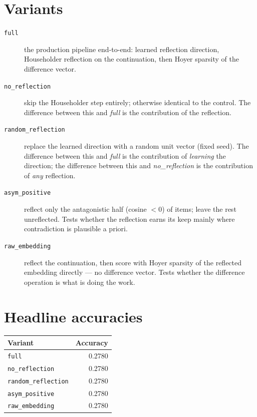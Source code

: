 \documentclass[11pt]{article}
\begin{document}
\section{Variants}
\begin{description}
\item[\texttt{full}] the production pipeline end-to-end: learned reflection direction, Householder reflection on the continuation, then Hoyer sparsity of the difference vector.
\item[\texttt{no\_reflection}] skip the Householder step entirely; otherwise identical to the control. The difference between this and \textit{full} is the contribution of the reflection.
\item[\texttt{random\_reflection}] replace the learned direction with a random unit vector (fixed seed). The difference between this and \textit{full} is the contribution of \emph{learning} the direction; the difference between this and \textit{no\_reflection} is the contribution of \emph{any} reflection.
\item[\texttt{asym\_positive}] reflect only the antagonistic half (cosine $< 0$) of items; leave the rest unreflected. Tests whether the reflection earns its keep mainly where contradiction is plausible a priori.
\item[\texttt{raw\_embedding}] reflect the continuation, then score with Hoyer sparsity of the reflected embedding directly --- no difference vector. Tests whether the difference operation is what is doing the work.
\end{description}

\section{Headline accuracies}
\begin{tabular}{l r}
\toprule
Variant & Accuracy \\
\midrule
\texttt{full} & 0.2780 \\
\texttt{no\_reflection} & 0.2780 \\
\texttt{random\_reflection} & 0.2780 \\
\texttt{asym\_positive} & 0.2780 \\
\texttt{raw\_embedding} & 0.2780 \\
\bottomrule
\end{tabular}
\end{document}
